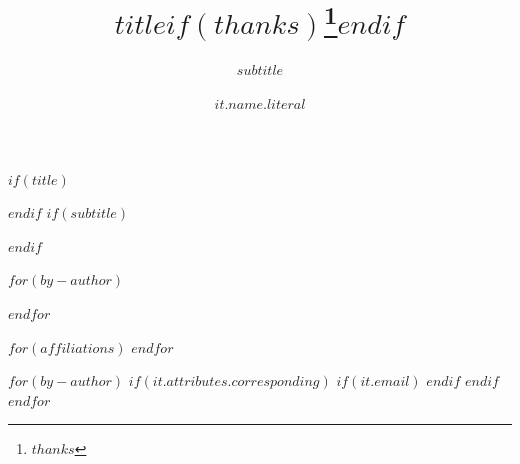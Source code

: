 $if(title)$
\title{$title$$if(thanks)$\thanks{$thanks$}$endif$}
$endif$
$if(subtitle)$
\subtitle{$subtitle$}
$endif$

$for(by-author)$
\author[$for(it.affiliations)$$it.id$$sep$,$endfor$$if(it.attributes.corresponding)$$if(it.affiliations)$,$endif$*$endif$]{$it.name.literal$}
$endfor$

$for(affiliations)$
$endfor$

$for(by-author)$
$if(it.attributes.corresponding)$
$if(it.email)$
$endif$
$endif$
$endfor$
\date{}

